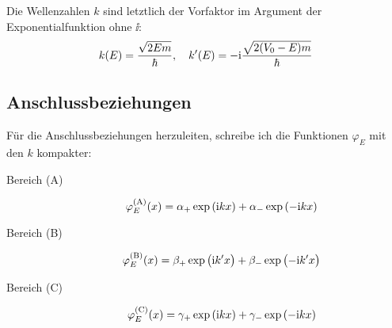 Die Wellenzahlen $k$ sind letztlich der Vorfaktor im Argument der
Exponentialfunktion ohne $\ii$:
\[
	k(E) = \frac{\sqrt{2Em}}\hbar
	,\quad
	k'(E) = - \mathrm i \frac{\sqrt{2(V_0-E)m}}\hbar
\]

\subsection{Anschlussbeziehungen}

Für die Anschlussbeziehungen herzuleiten, schreibe ich die Funktionen
$\varphi_E$ mit den $k$ kompakter:

\begin{description}
	\item[Bereich (A)]
		\[
			\phiA(x) = \alpha_+ \exp\del{\ii k x}
			+ \alpha_- \exp\del{-\ii k x}
		\]

	\item[Bereich (B)]
		\[
			\phiB(x) = \beta_+ \exp\del{\ii k' x}
			+ \beta_- \exp\del{-\ii k' x}
		\]

	\item[Bereich (C)]
		\[
			\phiC(x) = \gamma_+ \exp\del{\ii k x}
			+ \gamma_- \exp\del{-\ii k x}
		\]
\end{description}

